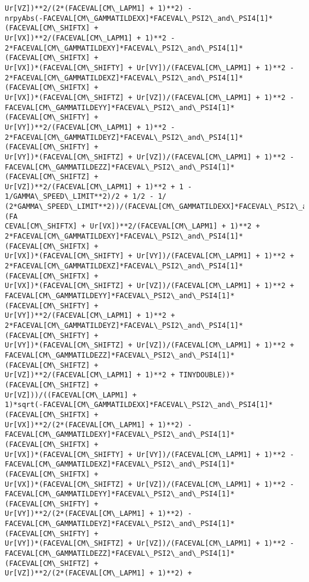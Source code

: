 \documentclass[landscape,letterpaper,10pt,english]{article}
\begin{document}
\begin{Verbatim}[commandchars=\\\{\}]
Ur[VZ])**2/(2*(FACEVAL[CM\_LAPM1] + 1)**2) -
nrpyAbs(-FACEVAL[CM\_GAMMATILDEXX]*FACEVAL\_PSI2\_and\_PSI4[1]*(FACEVAL[CM\_SHIFTX] +
Ur[VX])**2/(FACEVAL[CM\_LAPM1] + 1)**2 -
2*FACEVAL[CM\_GAMMATILDEXY]*FACEVAL\_PSI2\_and\_PSI4[1]*(FACEVAL[CM\_SHIFTX] +
Ur[VX])*(FACEVAL[CM\_SHIFTY] + Ur[VY])/(FACEVAL[CM\_LAPM1] + 1)**2 -
2*FACEVAL[CM\_GAMMATILDEXZ]*FACEVAL\_PSI2\_and\_PSI4[1]*(FACEVAL[CM\_SHIFTX] +
Ur[VX])*(FACEVAL[CM\_SHIFTZ] + Ur[VZ])/(FACEVAL[CM\_LAPM1] + 1)**2 -
FACEVAL[CM\_GAMMATILDEYY]*FACEVAL\_PSI2\_and\_PSI4[1]*(FACEVAL[CM\_SHIFTY] +
Ur[VY])**2/(FACEVAL[CM\_LAPM1] + 1)**2 -
2*FACEVAL[CM\_GAMMATILDEYZ]*FACEVAL\_PSI2\_and\_PSI4[1]*(FACEVAL[CM\_SHIFTY] +
Ur[VY])*(FACEVAL[CM\_SHIFTZ] + Ur[VZ])/(FACEVAL[CM\_LAPM1] + 1)**2 -
FACEVAL[CM\_GAMMATILDEZZ]*FACEVAL\_PSI2\_and\_PSI4[1]*(FACEVAL[CM\_SHIFTZ] +
Ur[VZ])**2/(FACEVAL[CM\_LAPM1] + 1)**2 + 1 - 1/GAMMA\_SPEED\_LIMIT**2)/2 + 1/2 - 1/
(2*GAMMA\_SPEED\_LIMIT**2))/(FACEVAL[CM\_GAMMATILDEXX]*FACEVAL\_PSI2\_and\_PSI4[1]*(FA
CEVAL[CM\_SHIFTX] + Ur[VX])**2/(FACEVAL[CM\_LAPM1] + 1)**2 +
2*FACEVAL[CM\_GAMMATILDEXY]*FACEVAL\_PSI2\_and\_PSI4[1]*(FACEVAL[CM\_SHIFTX] +
Ur[VX])*(FACEVAL[CM\_SHIFTY] + Ur[VY])/(FACEVAL[CM\_LAPM1] + 1)**2 +
2*FACEVAL[CM\_GAMMATILDEXZ]*FACEVAL\_PSI2\_and\_PSI4[1]*(FACEVAL[CM\_SHIFTX] +
Ur[VX])*(FACEVAL[CM\_SHIFTZ] + Ur[VZ])/(FACEVAL[CM\_LAPM1] + 1)**2 +
FACEVAL[CM\_GAMMATILDEYY]*FACEVAL\_PSI2\_and\_PSI4[1]*(FACEVAL[CM\_SHIFTY] +
Ur[VY])**2/(FACEVAL[CM\_LAPM1] + 1)**2 +
2*FACEVAL[CM\_GAMMATILDEYZ]*FACEVAL\_PSI2\_and\_PSI4[1]*(FACEVAL[CM\_SHIFTY] +
Ur[VY])*(FACEVAL[CM\_SHIFTZ] + Ur[VZ])/(FACEVAL[CM\_LAPM1] + 1)**2 +
FACEVAL[CM\_GAMMATILDEZZ]*FACEVAL\_PSI2\_and\_PSI4[1]*(FACEVAL[CM\_SHIFTZ] +
Ur[VZ])**2/(FACEVAL[CM\_LAPM1] + 1)**2 + TINYDOUBLE))*(FACEVAL[CM\_SHIFTZ] +
Ur[VZ]))/((FACEVAL[CM\_LAPM1] +
1)*sqrt(-FACEVAL[CM\_GAMMATILDEXX]*FACEVAL\_PSI2\_and\_PSI4[1]*(FACEVAL[CM\_SHIFTX] +
Ur[VX])**2/(2*(FACEVAL[CM\_LAPM1] + 1)**2) -
FACEVAL[CM\_GAMMATILDEXY]*FACEVAL\_PSI2\_and\_PSI4[1]*(FACEVAL[CM\_SHIFTX] +
Ur[VX])*(FACEVAL[CM\_SHIFTY] + Ur[VY])/(FACEVAL[CM\_LAPM1] + 1)**2 -
FACEVAL[CM\_GAMMATILDEXZ]*FACEVAL\_PSI2\_and\_PSI4[1]*(FACEVAL[CM\_SHIFTX] +
Ur[VX])*(FACEVAL[CM\_SHIFTZ] + Ur[VZ])/(FACEVAL[CM\_LAPM1] + 1)**2 -
FACEVAL[CM\_GAMMATILDEYY]*FACEVAL\_PSI2\_and\_PSI4[1]*(FACEVAL[CM\_SHIFTY] +
Ur[VY])**2/(2*(FACEVAL[CM\_LAPM1] + 1)**2) -
FACEVAL[CM\_GAMMATILDEYZ]*FACEVAL\_PSI2\_and\_PSI4[1]*(FACEVAL[CM\_SHIFTY] +
Ur[VY])*(FACEVAL[CM\_SHIFTZ] + Ur[VZ])/(FACEVAL[CM\_LAPM1] + 1)**2 -
FACEVAL[CM\_GAMMATILDEZZ]*FACEVAL\_PSI2\_and\_PSI4[1]*(FACEVAL[CM\_SHIFTZ] +
Ur[VZ])**2/(2*(FACEVAL[CM\_LAPM1] + 1)**2) +

\end{Verbatim}
\end{document}
